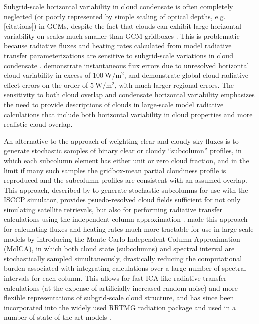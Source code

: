 Subgrid-scale horizontal variability in cloud condensate is often completely neglected (or poorly represented by simple scaling of optical depths, e.g. [citations]) in GCMs, despite the fact that clouds can exhibit large horizontal variability on scales much smaller than GCM gridboxes \citep[e.g.,][]{stephens_and_platt_1987}. This is problematic because radiative fluxes and heating rates calculated from model radiative transfer parameterizations are sensitive to subgrid-scale variations in cloud condensate \citep[e.g.,][]{barker_et_al_1999,wu_and_liang_2005,oreopoulos_et_al_2012}. \cite{barker_et_al_1999} demonstrate instantaneous flux errors due to unresolved horizontal cloud variability in excess of $100 ~\text{W}/\text{m}^2$, and \cite{oreopoulos_et_al_2012} demonstrate global cloud radiative effect errors on the order of $5 ~\text{W}/\text{m}^2$, with much larger regional errors. The sensitivity to both cloud overlap and condensate horizontal variability emphasizes the need to provide descriptions of clouds in large-scale model radiative calculations that include both horizontal variability in cloud properties and more realistic cloud overlap.

An alternative to the approach of weighting clear and cloudy sky fluxes is to generate stochastic samples of binary clear or cloudy ``subcolumn'' profiles, in which each subcolumn element has either unit or zero cloud fraction, and in the limit if many  such samples the gridbox-mean partial cloudiness profile is reproduced and the subcolumn profiles are consistent with an assumed overlap. This approach, described by \cite{klein_and_jakob_1999} to generate stochastic subcolumns for use with the ISCCP simulator, provides psuedo-resolved cloud fields sufficient for not only simulating satellite retrievals, but also for performing radiative transfer calculations using the independent column approximation \citep[ICA;][]{cahalan_et_al_1994}. \cite{pincus_et_al_2003} made this approach for calculating fluxes and heating rates much more tractable for use in large-scale models by introducing the Monte Carlo Independent Column Approximation (McICA), in which both cloud state (subcolumns) and spectral interval are stochastically sampled simultaneously, drastically reducing the computational burden associated with integrating calculations over a large number of spectral intervals for each column. This allows for fast ICA-like radiative transfer calculations (at the expense of artificially increased random noise) and more flexible representations of subgrid-scale cloud structure, and has since been incorporated into the widely used RRTMG radiation package and used in a number of state-of-the-art models \citep{iacono_et_al_2008, von_salzen_et_al_2012, neale_et_al_2010a, neale_et_al_2010b, donner_et_al_2011, hogan_et_al_2014}.

